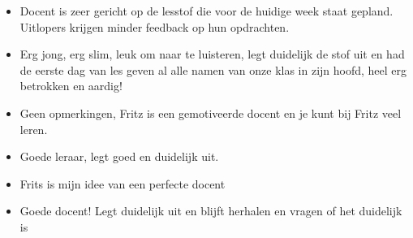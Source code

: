 \begin{itemize}
  \item Docent is zeer gericht op de lesstof die voor de huidige week staat gepland. Uitlopers krijgen minder feedback op hun opdrachten.
  \item Erg jong, erg slim, leuk om naar te luisteren, legt duidelijk de stof uit en had de eerste dag van les geven al alle namen van onze klas in zijn hoofd, heel erg betrokken en aardig!
  \item Geen opmerkingen, Fritz is een gemotiveerde docent en je kunt bij Fritz veel leren.
  \item Goede leraar, legt goed en duidelijk uit.
  \item Frits is mijn idee van een perfecte docent
  \item Goede docent! Legt duidelijk uit en blijft herhalen en vragen of het duidelijk is
\end{itemize}




